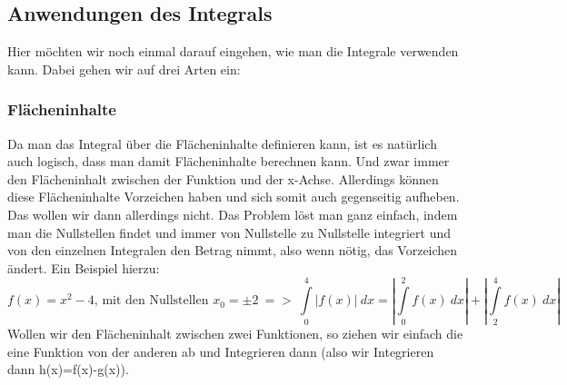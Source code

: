 \subsection{Anwendungen des Integrals}
Hier möchten wir noch einmal darauf eingehen, wie man die Integrale verwenden kann. Dabei gehen wir auf drei Arten ein:
\subsubsection{Flächeninhalte}
Da man das Integral über die Flächeninhalte definieren kann, ist es natürlich auch logisch, dass man damit Flächeninhalte berechnen kann. Und zwar immer den Flächeninhalt zwischen der Funktion und der x-Achse. Allerdings können diese Flächeninhalte Vorzeichen haben und sich somit auch gegenseitig aufheben. Das wollen wir dann allerdings nicht. Das Problem löst man ganz einfach, indem man die Nullstellen findet und immer von Nullstelle zu Nullstelle integriert und von den einzelnen Integralen den Betrag nimmt, also wenn nötig, das Vorzeichen ändert. Ein Beispiel hierzu:
\[f(x)=x^2-4\textrm{, mit den Nullstellen }x_0=\pm2\ =>\ \int\limits_0^4 |f(x)|\ dx=|\int\limits_0^2 f(x)\ dx|+|\int\limits_2^4 f(x)\ dx|\]
Wollen wir den Flächeninhalt zwischen zwei Funktionen, so ziehen wir einfach die eine Funktion von der anderen ab und Integrieren dann (also wir Integrieren dann h(x)=f(x)-g(x)).
